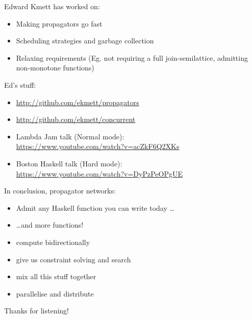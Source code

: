 \documentclass[usenames,dvipsnames,svgnames,table,aspectratio=1610,mathserif]{beamer}
\newcommand{\textslide}[1]{{
\begin{frame}
\begin{center}

#1

\end{center}
\end{frame}
}}
\newcommand{\textslideleft}[1]{{
\begin{frame}

#1

\end{frame}
}}
\begin{document}
\textslideleft{
Edward Kmett has worked on:

\begin{itemize}
\item Making propagators go fast
\item Scheduling strategies and garbage collection
\item Relaxing requirements (Eg. not requiring a full join-semilattice, admitting non-monotone functions)
\end{itemize}

Ed's stuff:
\begin{itemize}
\item \url{http://github.com/ekmett/propagators}
\item \url{http://github.com/ekmett/concurrent}
\item Lambda Jam talk (Normal mode): \\
      \url{https://www.youtube.com/watch?v=acZkF6Q2XKs}
\item Boston Haskell talk (Hard mode): \\
      \url{https://www.youtube.com/watch?v=DyPzPeOPgUE}

\end{itemize}
}

\textslideleft{

In conclusion, propagator networks:

\begin{itemize}
\item Admit any Haskell function you can write today \ldots
\item \ldots and more functions!
\item compute bidirectionally
\item give us constraint solving and search
\item mix all this stuff together
\item parallelise and distribute
\end{itemize}
}


\textslide{\Large{Thanks for listening!}}
\end{document}
